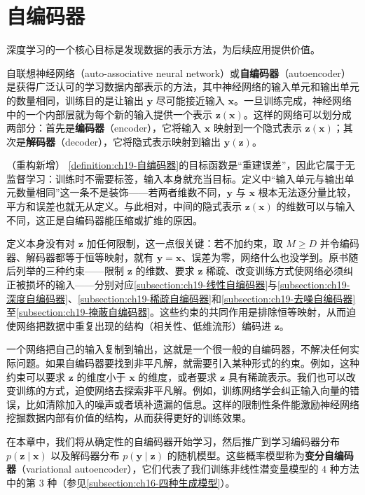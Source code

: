 \documentclass[../main.tex]{subfiles}
\begin{document}
\chapter{自编码器}\label{chapter:ch19-自编码器}

深度学习的一个核心目标是发现数据的表示方法，为后续应用提供价值。

\begin{definition}[自编码器]\label{definition:ch19-自编码器}
自联想神经网络（auto-associative neural network）或\textbf{自编码器}（autoencoder）是获得广泛认可的学习数据内部表示的方法，其中神经网络的输入单元和输出单元的数量相同，训练目的是让输出 $\bm{y}$ 尽可能接近输入 $\bm{x}$。一旦训练完成，神经网络中的一个内部层就为每个新的输入提供一个表示 $\bm{z}(\bm{x})$。这样的网络可以划分成两部分：首先是\textbf{编码器}（encoder），它将输入 $\bm{x}$ 映射到一个隐式表示 $\bm{z}(\bm{x})$；其次是\textbf{解码器}（decoder），它将隐式表示映射到输出 $\bm{y}(\bm{z})$。
\end{definition}

\begin{remark}（重构新增）
\cref{definition:ch19-自编码器}的目标函数是“重建误差”，因此它属于无监督学习：训练时不需要标签，输入本身就充当目标。定义中“输入单元与输出单元数量相同”这一条不是装饰——若两者维数不同，$\bm{y}$ 与 $\bm{x}$ 根本无法逐分量比较，平方和误差也就无从定义。与此相对，中间的隐式表示 $\bm{z}(\bm{x})$ 的维数可以与输入不同，这正是自编码器能压缩或扩维的原因。

定义本身没有对 $\bm{z}$ 加任何限制，这一点很关键：若不加约束，取 $M\geqslant D$ 并令编码器、解码器都等于恒等映射，就有 $\bm{y}=\bm{x}$、误差为零，网络什么也没学到。原书随后列举的三种约束——限制 $\bm{z}$ 的维数、要求 $\bm{z}$ 稀疏、改变训练方式使网络必须纠正被损坏的输入——分别对应\cref{subsection:ch19-线性自编码器}与\cref{subsection:ch19-深度自编码器}、\cref{subsection:ch19-稀疏自编码器}和\cref{subsection:ch19-去噪自编码器}至\cref{subsection:ch19-掩蔽自编码器}。这些约束的共同作用是排除恒等映射，从而迫使网络把数据中重复出现的结构（相关性、低维流形）编码进 $\bm{z}$。
\end{remark}

一个网络把自己的输入复制到输出，这就是一个很一般的自编码器，不解决任何实际问题。如果自编码器要找到非平凡解，就需要引入某种形式的约束。例如，这种约束可以要求 $\bm{z}$ 的维度小于 $\bm{x}$ 的维度，或者要求 $\bm{z}$ 具有稀疏表示。我们也可以改变训练的方式，迫使网络去探索非平凡解。例如，训练网络学会纠正输入向量的错误，比如清除加入的噪声或者填补遗漏的信息。这样的限制性条件能激励神经网络挖掘数据内部有价值的结构，从而获得更好的训练效果。

在本章中，我们将从确定性的自编码器开始学习，然后推广到学习编码器分布 $p(\bm{z}\mid\bm{x})$ 以及解码器分布 $p(\bm{y}\mid\bm{z})$ 的随机模型。这些概率模型称为\textbf{变分自编码器}（variational autoencoder），它们代表了我们训练非线性潜变量模型的 $4$ 种方法中的第 $3$ 种（参见\cref{subsection:ch16-四种生成模型}）。




\end{document}
